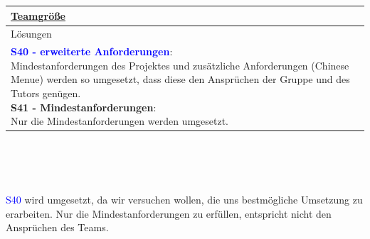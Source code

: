 \documentclass[enabledeprecatedfontcommands,fontsize=11pt,paper=a4,twoside]{scrartcl}
\newcounter{one}
\newcommand{\cb}[1]{{\textcolor{blue}{#1}}}
\begin{document}
\begin{tabular} {|p{8cm} p{8cm}|}
	\hyperlink {xx}{Teamgröße} 
	\\ \hline
	\multicolumn{2}{|l|}{Lösungen} \\
	\multicolumn{2}{|l|}{\parbox{16cm}{
			\textbf{\cb{\hypertarget{nnn}{S40 - erweiterte Anforderungen}}}: \\
			Mindestanforderungen des Projektes und zusätzliche Anforderungen (Chinese Menue) werden so umgesetzt, dass diese den Ansprüchen der Gruppe und des Tutors genügen. \\
			\textbf{S41 - Mindestanforderungen}: \\
			Nur die Mindestanforderungen werden umgesetzt. \\
	} }\\ [6ex] \hline
\end{tabular}\\ \\ \\
\begin{onehalfspace}
	\cb{S40} wird umgesetzt, da wir versuchen wollen, die uns bestmögliche Umsetzung zu erarbeiten. Nur die Mindestanforderungen zu erfüllen, entspricht nicht den Ansprüchen des Teams.
\end{onehalfspace}
\end{document}
